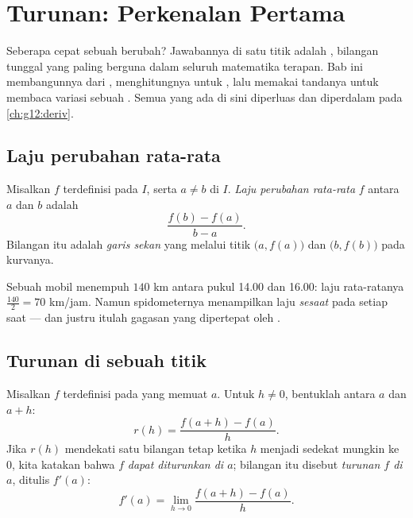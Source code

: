 \chapter{Turunan: Perkenalan Pertama}\label{ch:g11:deriv}

Seberapa cepat sebuah  berubah? Jawabannya di satu titik adalah
\emph{}, bilangan tunggal yang paling berguna dalam seluruh
matematika terapan. Bab ini membangunnya dari ,
menghitungnya untuk , lalu memakai tandanya untuk membaca
variasi sebuah . Semua yang ada di sini diperluas dan diperdalam pada
\cref{ch:g12:deriv}.

\section{Laju perubahan rata-rata}

\begin{definition}\label{def:g11:deriv:rate}
Misalkan $f$ terdefinisi pada  $I$, serta $a \neq b$ di $I$.
\emph{Laju perubahan rata-rata} $f$ antara
$a$ dan $b$ adalah
\[
\frac{f(b) - f(a)}{b - a}.
\]
Bilangan itu adalah  \emph{garis sekan} yang melalui
titik $\bigl(a, f(a)\bigr)$ dan $\bigl(b, f(b)\bigr)$ pada kurvanya.
\end{definition}

\begin{example}
Sebuah mobil menempuh $140$ km antara pukul 14.00 dan 16.00: laju rata-ratanya
$\frac{140}{2} = 70$ km/jam. Namun spidometernya menampilkan
laju \emph{sesaat} pada setiap saat --- dan justru itulah gagasan
yang dipertepat oleh .
\end{example}

\section{Turunan di sebuah titik}

\begin{definition}\label{def:g11:deriv:derivative}
Misalkan $f$ terdefinisi pada  yang memuat $a$. Untuk $h \neq 0$,
bentuklah  antara $a$ dan $a + h$:
\[
r(h) = \frac{f(a+h) - f(a)}{h}.
\]
Jika $r(h)$ mendekati satu bilangan tetap ketika $h$ menjadi sedekat mungkin ke
$0$, kita katakan bahwa $f$ \emph{dapat diturunkan di $a$};
bilangan itu disebut \emph{turunan $f$ di $a$}, ditulis $f'(a)$:
\[
f'(a) = \lim_{h \to 0} \frac{f(a+h) - f(a)}{h}.
\]
\end{definition}

